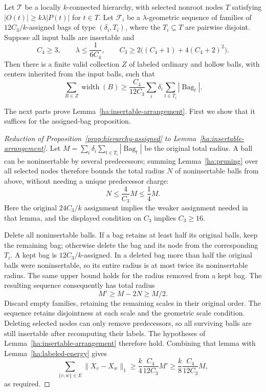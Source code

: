 \begin{lemma}\label{ha:insertable-arrangement}
Let $\mathcal T$ be a locally $k$-connected hierarchy, with selected
nonroot nodes $T$ satisfying $|O(t)|\ge k\lambda|P(t)|$ for $t\in T$.
Let $\mathcal F_i$ be a $\lambda$-geometric sequence of families
of $12C_3/k$-assigned bags of type $(\delta_i,T_i)$, where the
$T_i\subseteq T$ are pairwise disjoint.  Suppose all input balls are
insertable and
\[
 C_4\ge3,\qquad \lambda\le\frac{1}{6C_4},\qquad
 C_3\ge2\bigl((C_4+1)+4(C_4+2)^2\bigr).
\]
Then there is a finite valid collection $Z$ of labeled ordinary and
hollow balls, with centers inherited from the input balls, such that
\begin{equation}\label{ha:arrangement-width}
 \sum_{B\in Z}\operatorname{width}(B)
 \ge \frac{C_4}{12C_3}
       \sum_i\delta_i\sum_{t\in T_i}|\operatorname{Bag}_t|.
\end{equation}
\end{lemma}

The next parts prove Lemma~\ref{ha:insertable-arrangement}.  First we
show that it suffices for the assigned-bag proposition.

\begin{proof}[Reduction of Proposition~\ref{prop:hierarchy-assigned}
to Lemma~\ref{ha:insertable-arrangement}]
Let
$M=\sum_i\delta_i\sum_{t\in T_i}|\operatorname{Bag}_t|$
be the original total radius.  A ball can be noninsertable by several
predecessors; summing Lemma~\ref{ha:pruning} over all selected nodes
therefore bounds the total radius $N$ of noninsertable balls from
above, without needing a unique predecessor charge:
\begin{equation}\label{ha:preprocess-mass}
 N\le\frac{4}{C_3}M\le\frac14M.
\end{equation}
Here the original $24C_3/k$ assignment implies the weaker assignment
needed in that lemma, and the displayed condition on $C_3$ implies
$C_3\ge16$.

Delete all noninsertable balls.  If a bag retains at least half its
original balls, keep the remaining bag; otherwise delete the bag and
its node from the corresponding $T_i$.  A kept bag is
$12C_3/k$-assigned.  In a deleted bag more than half the original
balls were noninsertable, so its entire radius is at most twice its
noninsertable radius.  The same upper bound holds for the radius
removed from a kept bag.  The resulting sequence consequently has
total radius
\[
       M'\ge M-2N\ge M/2.
\]
Discard empty families, retaining the remaining scales in their
original order. The sequence retains disjointness at each scale
and the geometric scale condition. Deleting selected nodes can only remove predecessors,
so all surviving balls are still insertable after recomputing their
labels.  The hypotheses of Lemma~\ref{ha:insertable-arrangement}
therefore hold.  Combining that lemma with
Lemma~\ref{ha:labeled-energy} gives
\[
 \sum_{\{v,w\}\in E}\|X_v-X_w\|_1
 \ge\frac{k}{4}\frac{C_4}{12C_3}M'
 \ge\frac{k}{8}\frac{C_4}{12C_3}M,
\]
as required.
\end{proof}

